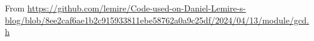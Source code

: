From \url{https://github.com/lemire/Code-used-on-Daniel-Lemire-s-blog/blob/8ee2caf6ae1b2c915933811ebe58762a0a9c25df/2024/04/13/module/gcd.h}